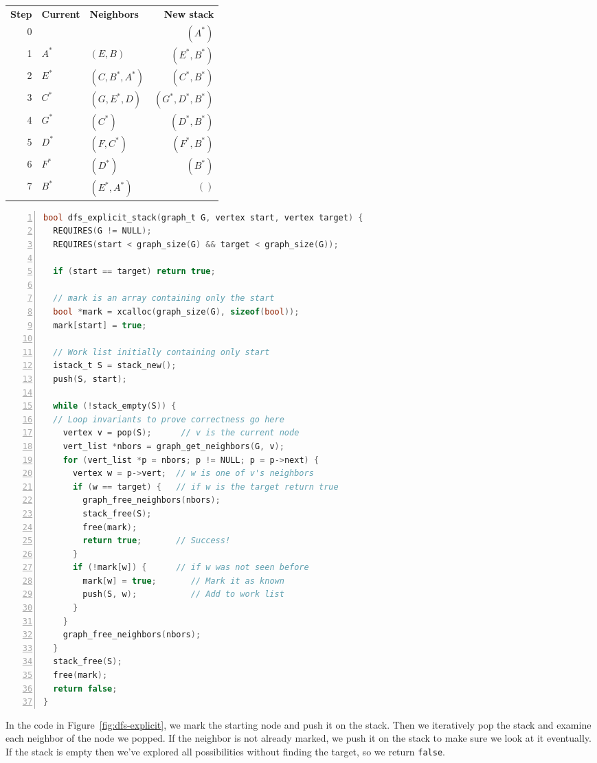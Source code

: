 \medskip
\begin{tabular}{rllr}
   {\bf Step} & {\bf Current} & {\bf Neighbors}
 & {\bf New stack}
\\ 0 &  &  & $(A^*)$
\\ 1 & $A^*$ & $(E,B)$       & $(E^*,B^*)$
\\ 2 & $E^*$ & $(C,B^*,A^*)$ & $(C^*,B^*)$
\\ 3 & $C^*$ & $(G,E^*,D)$   & $(G^*,D^*,B^*)$
\\ 4 & $G^*$ & $(C^*)$       & $(D^*,B^*)$
\\ 5 & $D^*$ & $(F, C^*)$    & $(F^*, B^*)$
\\ 6 & $F^*$ & $(D^*)$       & $(B^*)$
\\ 7 & $B^*$ & $(E^*,A^*)$   & $()$
\end{tabular}
\medskip

\begin{gram}
\label{fig:dfs-explicit}
\begin{lstlisting}[language=c, numbers=left]
bool dfs_explicit_stack(graph_t G, vertex start, vertex target) {
  REQUIRES(G != NULL);
  REQUIRES(start < graph_size(G) && target < graph_size(G));

  if (start == target) return true;

  // mark is an array containing only the start
  bool *mark = xcalloc(graph_size(G), sizeof(bool));
  mark[start] = true;

  // Work list initially containing only start
  istack_t S = stack_new();
  push(S, start);

  while (!stack_empty(S)) {
  // Loop invariants to prove correctness go here
    vertex v = pop(S);      // v is the current node
    vert_list *nbors = graph_get_neighbors(G, v);
    for (vert_list *p = nbors; p != NULL; p = p->next) {
      vertex w = p->vert;  // w is one of v's neighbors
      if (w == target) {   // if w is the target return true
        graph_free_neighbors(nbors);
        stack_free(S);
        free(mark);
        return true;       // Success!
      }
      if (!mark[w]) {      // if w was not seen before
        mark[w] = true;       // Mark it as known
        push(S, w);           // Add to work list
      }
    }
    graph_free_neighbors(nbors);
  }
  stack_free(S);
  free(mark);
  return false;
}
\end{lstlisting}
\end{gram}


In the code in Figure~\ref{fig:dfs-explicit}, we mark the starting
node and push it on the stack.  Then we iteratively pop the stack and
examine each neighbor of the node we popped. If the neighbor is not
already marked, we push it on the stack to make sure we look at it
eventually. If the stack is empty then we've explored all
possibilities without finding the target, so we return
\lstinline'false'.

